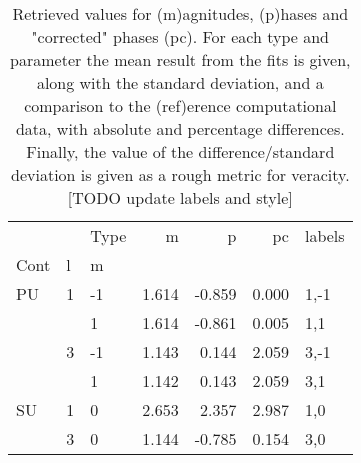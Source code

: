 \begin{table}

\begin{tabular}{lllrrrl}
\toprule
   &   & Type &     m &      p &    pc & labels \\
Cont & l & m &       &        &       &        \\
\midrule
PU & 1 & -1 & 1.614 & -0.859 & 0.000 &   1,-1 \\
   &   &  1 & 1.614 & -0.861 & 0.005 &    1,1 \\
   & 3 & -1 & 1.143 &  0.144 & 2.059 &   3,-1 \\
   &   &  1 & 1.142 &  0.143 & 2.059 &    3,1 \\
SU & 1 &  0 & 2.653 &  2.357 & 2.987 &    1,0 \\
   & 3 &  0 & 1.144 & -0.785 & 0.154 &    3,0 \\
\bottomrule
\end{tabular}

\caption{\label{tab:matE}Retrieved values for (m)agnitudes, (p)hases and "corrected" phases (pc). For each type and parameter the mean result from the fits is given, along with the standard deviation, and a comparison to the (ref)erence computational data, with absolute and percentage differences. Finally, the value of the difference/standard deviation is given as a rough metric for veracity. [TODO update labels and style]}
\end{table}